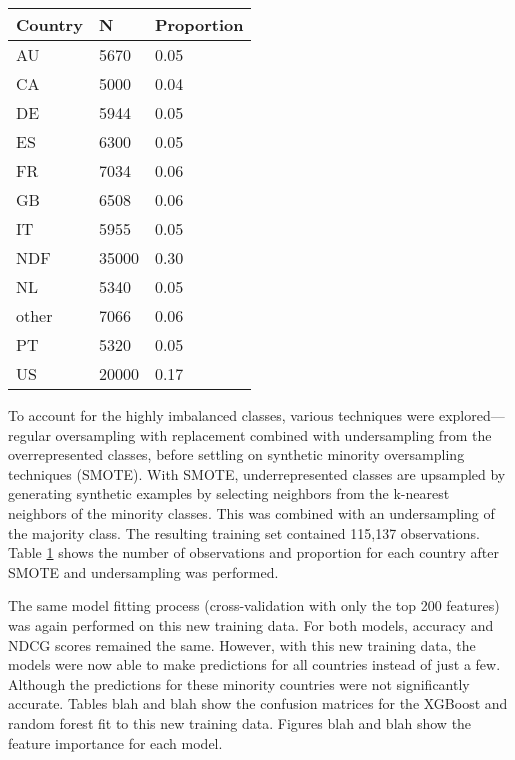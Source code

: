 \documentclass{article}
\begin{document}
\begin{table}[ht]
\centering
\begin{tabular}{| l | l | l |}
  \hline
  \textbf{Country} & \textbf{N} & \textbf{Proportion} \\ 
  \hline
  AU & 5670 & 0.05 \\ 
  CA & 5000 & 0.04 \\ 
  DE & 5944 & 0.05 \\ 
  ES & 6300 & 0.05 \\ 
  FR & 7034 & 0.06 \\ 
  GB & 6508 & 0.06 \\ 
  IT & 5955 & 0.05 \\ 
  NDF & 35000 & 0.30 \\ 
  NL & 5340 & 0.05 \\ 
  other & 7066 & 0.06 \\ 
  PT & 5320 & 0.05 \\ 
  US & 20000 & 0.17 \\ 
   \hline
\end{tabular}
\label{table:smote}
\end{table}

To account for the highly imbalanced classes, various techniques were explored---regular oversampling with 
replacement combined with undersampling from the overrepresented classes, before settling on 
synthetic minority oversampling techniques (SMOTE). With SMOTE, underrepresented classes are upsampled by
generating synthetic examples by selecting neighbors from the k-nearest neighbors of the minority classes. This was
combined with an undersampling of the majority class. The resulting training set contained 115,137 observations. 
Table \ref{table:smote} shows the number of observations and proportion for each country after SMOTE and 
undersampling was performed. 

The same model fitting process (cross-validation with only the top 200 features) was again performed 
on this new training data. For both models, accuracy and NDCG scores remained the same. However, with 
this new training data, the models were now able to make predictions for all countries instead of just a few. 
Although the predictions for these minority countries were not significantly accurate. Tables blah and blah 
show the confusion matrices for the XGBoost and random forest fit to this new training data. Figures blah 
and blah show the feature importance for each model. 
\end{document}
